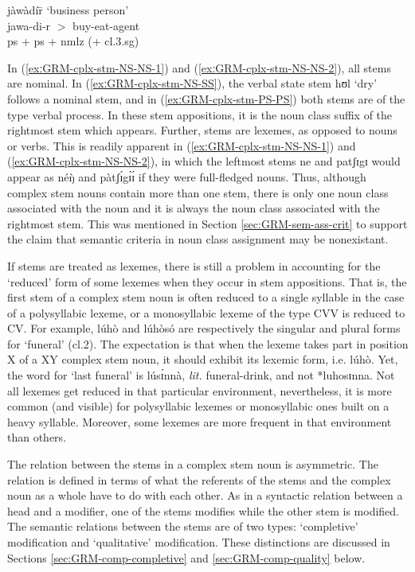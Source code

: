 \begin{exe}
\begin{exe}
\begin{exe}
{\begin{exe}
\begin{exe}
\begin{exe}
\begin{exe}
 \ex\label{exːGRM-cplx-stm-PS-PS}
 {\sls jàwàdír̄} {\rm  `business person'}\\ %
jawa-di-r  $>$ {\sc buy-eat-agent}\\  %
 {\sc ps} + {\sc ps} + {\sc nmlz} (+ {\sc cl.3.sg})

 
\z 
 \z



In (\ref{exːGRM-cplx-stm-NS-NS-1}) and (\ref{exːGRM-cplx-stm-NS-NS-2}),  all 
stems are nominal. In (\ref{exːGRM-cplx-stm-NS-SS}),  the verbal state stem 
{\sls 
hʊl} `dry'  follows a nominal stem,  and  in  (\ref{exːGRM-cplx-stm-PS-PS}) 
both 
stems are of the type verbal process.  In these stem appositions, it is the 
noun 
class suffix of the rightmost stem which appears. Further, stems are lexemes, 
as 
opposed to nouns or verbs.  This is readily apparent in  
(\ref{exːGRM-cplx-stm-NS-NS-1}) and (\ref{exːGRM-cplx-stm-NS-NS-2}), in which 
the leftmost stems {\sls ne} and {\sls patʃɪgɪ} would appear as {\sls néŋ̀} 
and 
{\sls pàtʃɪ́gɪ́ɪ́} if they were full-fledged nouns. Thus, although complex 
stem 
nouns contain more than one stem, there is only  one noun class associated with 
the noun and it is always the noun class associated with the rightmost stem.  
This was mentioned in Section \ref{sec:GRM-sem-ass-crit} to support the claim  
that semantic criteria in noun class assignment may be  nonexistant. 


If  stems are treated as lexemes, there is still a problem in accounting for the
 `reduced' form of  some lexemes when they occur in stem appositions. That
is, the first stem  of a complex stem noun is often reduced to a single
syllable in the case of a polysyllabic lexeme, or a monosyllabic lexeme of the
type CVV is reduced to CV. For
example,  {\sls lúhò}  and  {\sls lúhòsó} are respectively the singular and
plural forms for 
`funeral' ({\sc cl.2}).  The expectation is that
when the lexeme takes part in position X of a XY complex stem noun,
it should exhibit its lexemic form, i.e.   {\sls lúhò}. Yet, the word for 
`last
funeral'  is {\sls lúsɪ́nnà}, {\it lit.} funeral-drink,  and not {\sls 
*luhosɪnna}.  Not all  lexemes get reduced in that particular 
environment, nevertheless, it is  more common (and visible)  for polysyllabic 
lexemes or
monosyllabic ones built on a heavy syllable. Moreover, some lexemes are more
frequent in that environment than others.


The relation between the stems in a complex stem noun is asymmetric.  The 
relation is defined in terms of what the referents of the stems and the complex 
noun as a whole have to do with each other.  As in a syntactic relation between 
a head and a modifier, one of the stems modifies while the other stem is 
modified. The semantic relations between the stems  are of two types: 
`completive' modification and  `qualitative' modification. These distinctions 
are discussed in  Sections \ref{sec:GRM-comp-completive} and 
\ref{sec:GRM-comp-quality} below.



\end{exe}
\end{exe}
\end{exe}
\end{exe}}
\end{exe}
\end{exe}
\end{exe}
